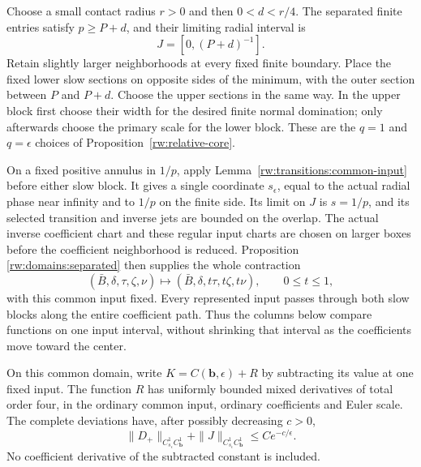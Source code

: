 Choose a small contact radius $r>0$ and then $0<d<r/4$.
The separated finite entries satisfy $p\ge P+d$, and their limiting
radial interval is
\[
 J=[0,(P+d)^{-1}].
\]
Retain slightly larger neighborhoods at every fixed finite boundary.
Place the fixed lower slow sections on opposite sides of the minimum,
with the outer section between $P$ and $P+d$. Choose the upper
sections in the same way. In the upper block first choose their
width for the desired finite normal domination; only afterwards
choose the primary scale for the lower block. These are the
$q=1$ and $q=\epsilon$ choices of
Proposition~\ref{rw:relative-core}.

On a fixed positive annulus in $1/p$, apply
Lemma~\ref{rw:transitions:common-input} before either slow block.
It gives a single coordinate $s_\epsilon$, equal to the actual
radial phase near infinity and to $1/p$ on the finite side. Its
limit on $J$ is $s=1/p$, and its selected transition and inverse
jets are bounded on the overlap. The actual inverse coefficient
chart and these regular input charts are chosen on larger boxes
before the coefficient neighborhood is reduced. Proposition
\ref{rw:domains:separated} then supplies the whole contraction
\[
 (\bar B,\delta,\tau,\zeta,\nu)\longmapsto
 (\bar B,\delta,t\tau,t\zeta,t\nu),\qquad0\le t\le1,
\]
with this common input fixed. Every represented input passes through
both slow blocks along the entire coefficient path. Thus the columns
below compare functions on one input interval, without shrinking that
interval as the coefficients move toward the center.

\begin{lemma}
\label{rw:joint:relative-expression}
On this common domain, write $K=C(\mathbf b,\epsilon)+R$ by
subtracting its value at one fixed input. The function $R$ has
uniformly bounded mixed derivatives of total order four, in the
ordinary common input, ordinary coefficients and Euler scale.
The complete deviations have, after possibly decreasing $c>0$,
\begin{equation}\label{rw:joint:absolute}
 \|D_+\|_{C_{s_\epsilon}^1C_{\mathbf b}^1}
       +\|J\|_{C_{s_\epsilon}^1C_{\mathbf b}^1}
       \le Ce^{-c/\epsilon}.
\end{equation}
No coefficient derivative of the subtracted constant is included.
\end{lemma}

